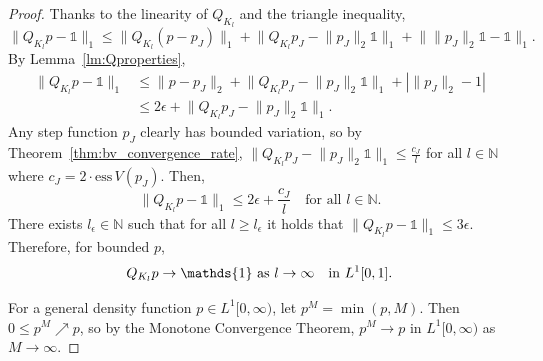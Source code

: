 \documentclass[a4paper]{article}
\theoremstyle{definition}
\numberwithin{equation}{section}
\numberwithin{theorem}{section}
\newcommand{\ess}{\mathrm{ess}\,}
\begin{document}
{\begin{proof}
    Thanks to the linearity of $Q_{K_l}$ and the triangle inequality,
    \begin{equation*}
        \lVert Q_{K_l} p -\mathds{1}\rVert_1 \leq \rVert Q_{K_l} (p - p_J)\rVert_1 +\lVert Q_{K_l} p_J - \lVert p_J\rVert_2\mathds{1}\rVert_1 + \lVert \lVert p_J\rVert_2\mathds{1}-\mathds{1}\rVert_1.
    \end{equation*}
    By Lemma~\ref{lm:Qproperties},
    \begin{align*}
        \lVert Q_{K_l} p -\mathds{1}\rVert_1 &\leq\lVert p-p_J\rVert_2 + \lVert Q_{K_l} p_J - \lVert p_J\rVert_2\mathds{1}\rVert_1+|\lVert p_J\rVert_2-1|\\
        &\leq 2\epsilon+\lVert Q_{K_l} p_J - \lVert p_J\rVert_2\mathds{1}\rVert_1.
    \end{align*}
    Any step function $p_J$ clearly has bounded variation, so by Theorem~\ref{thm:bv_convergence_rate}, $\lVert Q_{K_l} p_J-\lVert p_J\rVert_2\mathds{1}\rVert_1 \leq \frac{c_J}{l}$ for all $l\in\mathbb{N}$ where $c_J=2\cdot\ess V(p_J)$. Then,
    \begin{equation*}
        \lVert Q_{K_l} p -\mathds{1}\rVert_1 \leq2\epsilon+\frac{c_J}{l}\quad\text{for all $l\in\mathbb{N}$}.
    \end{equation*}
    There exists $l_\epsilon\in\mathbb{N}$ such that for all $l\geq l_\epsilon$ it holds that $\lVert Q_{K_l}p -\mathds{1}\rVert_1\leq3\epsilon$. Therefore, for bounded $p$,
    \begin{equation*}
        Q_{K_l}p\rightarrow\mathds{1}\text{ as $l\rightarrow\infty$}\quad\text{in $ L^1[0,1]$.}
    \end{equation*}

    For a general density function $p\in L^1[0,\infty)$, let $p^M = \min(p,M)$. Then $0\leq p^M \nearrow p$, so by the Monotone Convergence Theorem, $p^M \rightarrow p$ in $ L^1[0,\infty)$ as $M\rightarrow\infty$.


\end{proof}}
\end{document}
